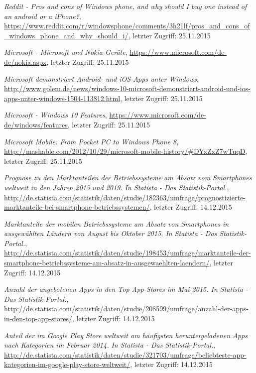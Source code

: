 \begin{thebibliography}{}
\emph{Reddit - Pros and cons of Windows phone, and why should I buy one instead of an android or a iPhone?},
\url{https://www.reddit.com/r/windowsphone/comments/3h21lf/pros_and_cons_of_windows_phone_and_why_should_i/}, letzter Zugriff: 25.11.2015

\emph{Microsoft - Microsoft und Nokia Geräte},
\url{https://www.microsoft.com/de-de/nokia.aspx}, letzter Zugriff: 25.11.2015

\emph{Microsoft demonstriert Android- und iOS-Apps unter Windows},
\url{http://www.golem.de/news/windows-10-microsoft-demonstriert-android-und-ios-apps-unter-windows-1504-113812.html}, letzter Zugriff: 25.11.2015

\emph{Microsoft - Windows 10 Features},
\url{https://www.microsoft.com/de-de/windows/features}, letzter Zugriff: 25.11.2015

\emph{Microsoft Mobile: From Pocket PC to Windows Phone 8},
\url{http://mashable.com/2012/10/29/microsoft-mobile-history/#DYxZxZ7wTuqD}, letzter Zugriff: 25.11.2015

\emph{Prognose zu den Marktanteilen der Betriebssysteme am Absatz vom Smartphones weltweit in den Jahren 2015 und 2019. In Statista - Das Statistik-Portal.},
\url{http://de.statista.com/statistik/daten/studie/182363/umfrage/prognostizierte-marktanteile-bei-smartphone-betriebssystemen/}, letzter Zugriff: 14.12.2015

\emph{Marktanteile der mobilen Betriebssysteme am Absatz von Smartphones in ausgewählten Ländern von August bis Oktober 2015. In Statista - Das Statistik-Portal.},
\url{http://de.statista.com/statistik/daten/studie/198453/umfrage/marktanteile-der-smartphone-betriebssysteme-am-absatz-in-ausgewaehlten-laendern/}, letzter Zugriff: 14.12.2015

\emph{Anzahl der angebotenen Apps in den Top App-Stores im Mai 2015. In Statista - Das Statistik-Portal.},
\url{http://de.statista.com/statistik/daten/studie/208599/umfrage/anzahl-der-apps-in-den-top-app-stores/}, letzter Zugriff: 14.12.2015

\emph{Anteil der im Google Play Store weltweit am häufigsten heruntergeladenen Apps nach Kategorien im Februar 2014. In Statista - Das Statistik-Portal.},
\url{http://de.statista.com/statistik/daten/studie/321703/umfrage/beliebteste-app-kategorien-im-google-play-store-weltweit/}, letzter Zugriff: 14.12.2015


\end{thebibliography}

